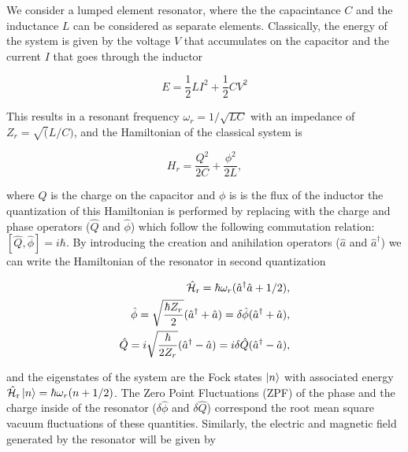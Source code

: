 
We consider a lumped element resonator, where the the capacintance $C$ and the inductance $L$ can be considered as separate elements. Classically, the energy of the system is given by the voltage $V$ that accumulates on the capacitor and the current $I$ that goes through the inductor 

\begin{equation}
    E = \frac{1}{2}LI^2 + \frac{1}{2}CV^2
\end{equation}

This results in a resonant frequency $\omega_r=1/\sqrt{LC}$ with an impedance of $Z_r = \sqrt(L/C)$, and the Hamiltonian of the classical system is 

\begin{equation}
    H_r =\frac{Q^2}{2C} + \frac{\phi^2}{2L}, 
\end{equation}

where $Q$ is the charge on the capacitor and $\phi$ is is the flux of the inductor the quantization of this Hamiltonian is performed by replacing with the charge and phase operators ($\hat{Q}$ and $\hat{\phi}$) which follow the following commutation relation: $[\hat{Q}, \hat{\phi}]=i\hbar$. By introducing the creation and anihilation operators ($\hat{a}$ and $\hat{a}^\dagger$) we can write the Hamiltonian of the resonator in second quantization

\begin{align}
\begin{split}
    \hat{\mathcal{H}}_{\text{r}} = \hbar \omega_r(\hat{a}^\dagger \hat{a} + 1/2), \\
    \hat{\phi} = \sqrt{\frac{\hbar Z_r}{2}} (\hat{a}^\dagger + \hat{a}) = \delta \hat{\phi} (\hat{a}^\dagger + \hat{a}), \\
    \hat{Q} = i \sqrt{\frac{\hbar}{2 Z_r}} (\hat{a}^\dagger - \hat{a}) = i \delta \hat{Q} (\hat{a}^\dagger - \hat{a}),
\end{split}
\end{align}

\noindent and the eigenstates of the system are the Fock states $\ket{n}$ with associated energy $\hat{\mathcal{H}}_{\text{r}}\ket{n} = \hbar \omega_r (n + 1/2)$. The Zero Point Fluctuations (ZPF) of the phase and the charge inside of the resonator ($\delta \hat{\phi}$ and $\delta \hat{Q}$) correspond the root mean square vacuum fluctuations of these quantities. Similarly, the electric and magnetic field generated by the resonator will be given by

